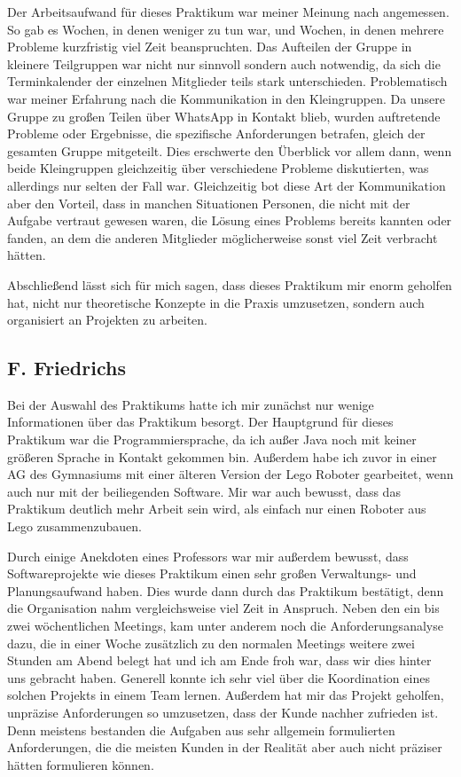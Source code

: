 \documentclass[oneside,abstractoff,a4paper]{scrartcl}
\begin{document}
Der Arbeitsaufwand für dieses Praktikum war meiner Meinung nach angemessen. So gab es Wochen, in denen weniger zu tun war, und Wochen, in denen mehrere Probleme kurzfristig viel Zeit beanspruchten. Das Aufteilen der Gruppe in kleinere Teilgruppen war nicht nur sinnvoll sondern auch notwendig, da sich die Terminkalender der einzelnen Mitglieder teils stark unterschieden. Problematisch war meiner Erfahrung nach die Kommunikation in den Kleingruppen. Da unsere Gruppe zu großen Teilen über WhatsApp in Kontakt blieb, wurden auftretende Probleme oder Ergebnisse, die spezifische Anforderungen betrafen, gleich der gesamten Gruppe mitgeteilt. Dies erschwerte den Überblick vor allem dann, wenn beide Kleingruppen gleichzeitig über verschiedene Probleme diskutierten, was allerdings nur selten der Fall war. Gleichzeitig bot diese Art der Kommunikation aber den Vorteil, dass in manchen Situationen Personen, die nicht mit der Aufgabe vertraut gewesen waren, die Lösung eines Problems bereits kannten oder fanden, an dem die anderen Mitglieder möglicherweise sonst viel Zeit verbracht hätten.

Abschließend lässt sich für mich sagen, dass dieses Praktikum mir enorm geholfen hat, nicht nur theoretische Konzepte in die Praxis umzusetzen, sondern auch organisiert an Projekten zu arbeiten.


\subsection{F. Friedrichs}

Bei der Auswahl des Praktikums hatte ich mir zunächst nur wenige Informationen über das Praktikum besorgt. Der Hauptgrund für dieses Praktikum war die Programmiersprache, da ich außer Java noch mit keiner größeren Sprache in Kontakt gekommen bin. Außerdem habe ich zuvor in einer AG des Gymnasiums mit einer älteren Version der Lego Roboter gearbeitet, wenn auch nur mit der beiliegenden Software. Mir war auch bewusst, dass das Praktikum deutlich mehr Arbeit sein wird, als einfach nur einen Roboter aus Lego zusammenzubauen. 

Durch einige Anekdoten eines Professors war mir außerdem bewusst, dass Softwareprojekte wie dieses Praktikum einen sehr großen Verwaltungs- und Planungsaufwand haben. Dies wurde dann durch das Praktikum bestätigt, denn die Organisation nahm vergleichsweise viel Zeit in Anspruch. Neben den ein bis zwei wöchentlichen Meetings, kam unter anderem noch die Anforderungsanalyse dazu, die in einer Woche zusätzlich zu den normalen Meetings weitere zwei Stunden am Abend belegt hat und ich am Ende froh war, dass wir dies hinter uns gebracht haben. Generell konnte ich sehr viel über die Koordination eines solchen Projekts in einem Team lernen. Außerdem hat mir das Projekt geholfen, unpräzise Anforderungen so umzusetzen, dass der Kunde nachher zufrieden ist. Denn meistens bestanden die Aufgaben aus sehr allgemein formulierten Anforderungen, die die meisten Kunden in der Realität aber auch nicht präziser hätten formulieren können. 
\end{document}
